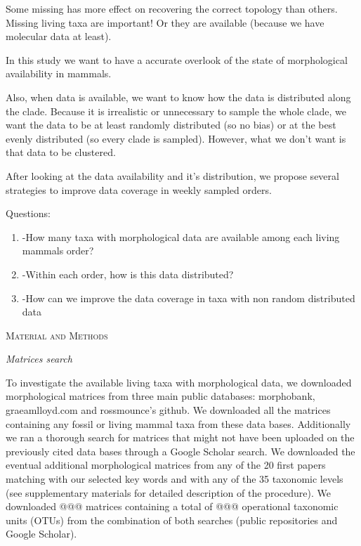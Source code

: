 \documentclass[12pt,letterpaper]{article}
\renewcommand{\section}[1]{%
\bigskip
\begin{center}
\begin{Large}
\normalfont\scshape #1
\medskip
\end{Large}
\end{center}}
\renewcommand{\subsection}[1]{%
\bigskip
\begin{center}
\begin{large}
\normalfont\itshape #1
\end{large}
\end{center}}
\begin{document}
Some missing has more effect on recovering the correct topology than others. Missing living taxa are important! Or they are available (because we have molecular data at least).

In this study we want to have a accurate overlook of the state of morphological availability in mammals.

Also, when data is available, we want to know how the data is distributed along the clade. Because it is irrealistic or unnecessary to sample the whole clade, we want the data to be at least randomly distributed (so no bias) or at the best evenly distributed (so every clade is sampled). However, what we don't want is that data to be clustered.

After looking at the data availability and it's distribution, we propose several strategies to improve data coverage in weekly sampled orders.

Questions:
\begin{enumerate}
\item{-How many taxa with morphological data are available among each living mammals order?}
\item{-Within each order, how is this data distributed?}
\item{-How can we improve the data coverage in taxa with non random distributed data}
\end{enumerate}


%
%
 
\newpage

\section{Material and Methods}
\subsection{Matrices search}
To investigate the available living taxa with morphological data, we downloaded morphological matrices from three main public databases: morphobank, graeamlloyd.com and rossmounce's github. We downloaded all the matrices containing any fossil or living mammal taxa from these data bases. Additionally we ran a thorough search for matrices that might not have been uploaded on the previously cited data bases through a Google Scholar search. We downloaded the eventual additional morphological matrices from any of the 20 first papers matching with our selected key words and with any of the 35 taxonomic levels (see supplementary materials for detailed description of the procedure). We downloaded @@@ %
matrices containing a total of @@@%
operational taxonomic units (OTUs) from the combination of both searches (public repositories and Google Scholar).
\end{document}

